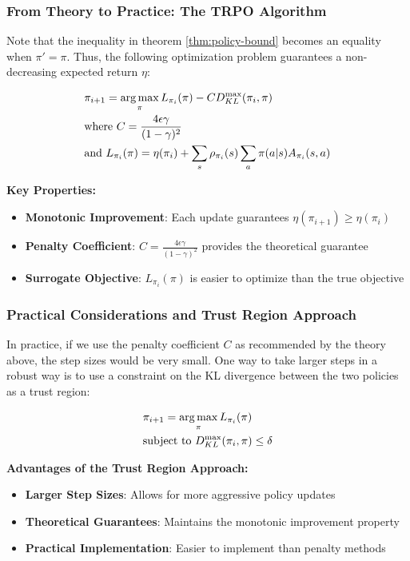 \subsubsection{From Theory to Practice: The TRPO Algorithm}

Note that the inequality in theorem \ref{thm:policy-bound} becomes an equality when $\pi' = \pi$. Thus, the following optimization problem guarantees a non-decreasing expected return $\eta$:

\begin{align*}
    &\pi_{i + 1} = \operatorname*{arg\,max}_{\pi} L_{\pi_i}(\pi) - CD_{KL}^{\max}(\pi_i, \pi)\\
    &\text{where } C = \frac{4\epsilon\gamma}{(1-\gamma)^2}\\
    &\text{and } L_{\pi_i}(\pi) = \eta(\pi_i) + \sum_{s}\rho_{\pi_i}(s)\sum_{a}\pi(a|s)A_{\pi_i}(s, a)
\end{align*}

\textbf{Key Properties:}
\begin{itemize}
    \item \textbf{Monotonic Improvement}: Each update guarantees $\eta(\pi_{i+1}) \geq \eta(\pi_i)$
    \item \textbf{Penalty Coefficient}: $C = \frac{4\epsilon\gamma}{(1-\gamma)^2}$ provides the theoretical guarantee
    \item \textbf{Surrogate Objective}: $L_{\pi_i}(\pi)$ is easier to optimize than the true objective
\end{itemize}

\subsubsection{Practical Considerations and Trust Region Approach}

In practice, if we use the penalty coefficient $C$ as recommended by the theory above, the step sizes would be very small. One way to take larger steps in a robust way is to use a constraint on the KL divergence between the two policies as a trust region:

\begin{align*}
    &\pi_{i + 1} = \operatorname*{arg\,max}_{\pi} L_{\pi_i}(\pi)\\
    &\text{subject to } D_{KL}^{\max}(\pi_i, \pi) \le \delta
\end{align*}

\textbf{Advantages of the Trust Region Approach:}
\begin{itemize}
    \item \textbf{Larger Step Sizes}: Allows for more aggressive policy updates
    \item \textbf{Theoretical Guarantees}: Maintains the monotonic improvement property
    \item \textbf{Practical Implementation}: Easier to implement than penalty methods
\end{itemize}

